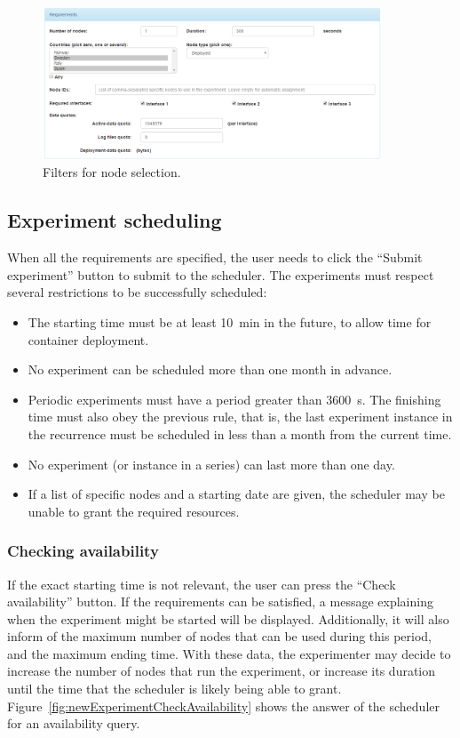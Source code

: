 \documentclass[a4paper,10pt]{article}
\begin{document}
\begin{figure}[tp]
	\centering
	\includegraphics[width=0.9\textwidth]{NewExperimentFilters.png}
	\caption{Filters for node selection.}
	\label{fig:newExperimentFilters}
\end{figure}

\subsection{Experiment scheduling}
\label{subsec:experimentScheduling}

When all the requirements are specified, the user needs to click the ``Submit experiment'' button to submit to the scheduler.
The experiments must respect several restrictions to be successfully scheduled:
\begin{itemize}
	\item The starting time must be at least \SI{10}{\minute} in the future, to allow time for container deployment.
	\item No experiment can be scheduled more than one month in advance.
	\item Periodic experiments must have a period greater than \SI{3600}{\second}.
	The finishing time must also obey the previous rule, that is, the last experiment instance in the recurrence must be scheduled in less than a month from the current time.
	\item No experiment (or instance in a series) can last more than one day.
	\item If a list of specific nodes and a starting date are given, the scheduler may be unable to grant the required resources.
\end{itemize}

\subsubsection{Checking availability}
If the exact starting time is not relevant, the user can press the ``Check availability'' button.
If the requirements can be satisfied, a message explaining when the experiment might be started will be displayed.
Additionally, it will also inform of the maximum number of nodes that can be used during this period, and the maximum ending time.
With these data, the experimenter may decide to increase the number of nodes that run the experiment, or increase its duration until the time that the scheduler is likely being able to grant.
Figure~\ref{fig:newExperimentCheckAvailability} shows the answer of the scheduler for an availability query.
\end{document}
